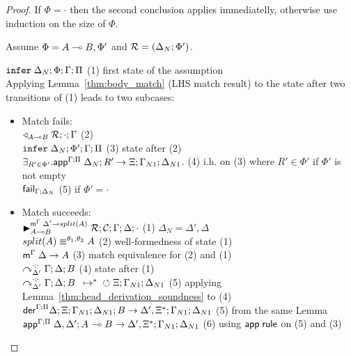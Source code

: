 \begin{proof}
If $\Phi = \cdot$ then the second conclusion applies immediatelly, otherwise use
induction on the size of $\Phi$.

Assume $\Phi = A \lolli B, \Phi'$ and $\rulestk = (\Delta_N; \Phi')$.

$\dostate{\Delta_N}{\Phi}{\Gamma}{\Pi}$ \hfill (1) first state of the assumption \\

Applying Lemma~\ref{thm:body_match} (LHS match result) to the state after two
transitions of (1) leads to two subcases:

\begin{itemize}[leftmargin=*]
   \item Match fails: \\
   $\contstate{A \lolli B}{\rulestk}{\cdot}{\Gamma}$ \hfill (2) \\
   $\dostate{\Delta_N}{\Phi'}{\Gamma}{\Pi}$ \hfill (3) state after (2) \\

   $\exists_{R' \in \Phi'}. \az{\Gamma}{\Delta_N}{\Pi}{R'}{\Xi; \Gamma_{N1};
   \Delta_{N1}}$. \hfill (4) i.h. on (3) where $R' \in \Phi'$ if $\Phi'$ is
   not empty \\

   $\failstate{\Gamma}{\Delta_N}$ \hfill (5) if $\Phi' = \cdot$ \\

   \item Match succeeds: \\

   $\matstate{A \lolli B}{\rulestk}{\lstack{C}}{\Gamma}{\Delta}{\cdot}{\Delta'
      \rightarrow split(A)}$ \hfill (1) $\Delta_N = \Delta', \Delta$ \\

   $\feq{split(A)}{A}$ \hfill (2) well-formedness of state (1) \\

   $\mz{\Gamma}{\Delta}{A}$ \hfill (3) match equivalence for (2) and (1) \\

   $\derstatex{\Gamma}{\Delta}{\Delta'}{\cdot}{\cdot}{B}$ \hfill (4) state
   after (1) \\

   $\transs{\derstatex{\Gamma}{\Delta}{\Delta'}{\cdot}{\cdot}{B}}{\finalstate{\Xi}{\Gamma_{N1}}{\Delta_{N1}}}$
   \hfill (5) applying Lemma~\ref{thm:head_derivation_soundness} to (4) \\

   $\dz{\Gamma}{\Pi}{\Delta}{\Xi}{\Gamma_{N1}}{\Delta_{N1}}{B}{\Delta', \Xi^{*}; \Gamma_{N1}; \Delta_{N1}}$ \hfill (5) from the
      same Lemma \\

   $\az{\Gamma}{\Delta, \Delta'}{\Pi}{A \lolli B}{\Delta', \Xi^{*}; \Gamma_{N1};
      \Delta_{N1}}$ \hfill (6) using $\azname \m{rule}$ on (5) and (3) \\

\end{itemize}

\end{proof}
